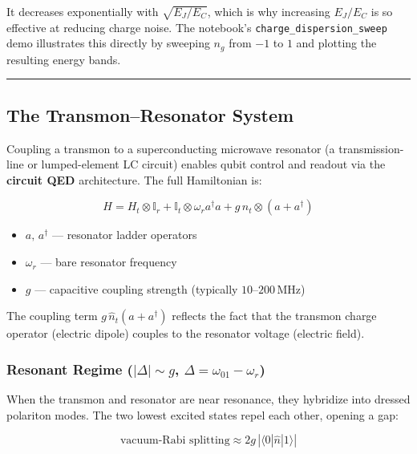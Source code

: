 \documentclass[11pt]{article}
\newcommand{\braket}[2]{\langle #1 | #2 \rangle}
\begin{document}
It decreases exponentially with $\sqrt{E_J/E_C}$, which is why increasing $E_J/E_C$ is so
effective at reducing charge noise. The notebook's \texttt{charge\_dispersion\_sweep} demo
illustrates this directly by sweeping $n_g$ from $-1$ to $1$ and plotting the resulting energy
bands.

\hrule
\vspace{1em}

\subsection{The Transmon--Resonator System}

Coupling a transmon to a superconducting microwave resonator (a transmission-line or
lumped-element LC circuit) enables qubit control and readout via the \textbf{circuit QED}
architecture. The full Hamiltonian is:

\begin{equation}
  H = H_t \otimes \mathbb{I}_r
      + \mathbb{I}_t \otimes \omega_r a^\dagger a
      + g\,\hat{n}_t \otimes \!\left(a + a^\dagger\right)
\end{equation}

\begin{itemize}
  \item $a,\,a^\dagger$ --- resonator ladder operators
  \item $\omega_r$ --- bare resonator frequency
  \item $g$ --- capacitive coupling strength (typically $10$--$200\,\text{MHz}$)
\end{itemize}

The coupling term $g\,\hat{n}_t(a + a^\dagger)$ reflects the fact that the transmon charge
operator (electric dipole) couples to the resonator voltage (electric field).

\subsubsection{Resonant Regime ($|\Delta| \sim g$, $\Delta = \omega_{01} - \omega_r$)}

When the transmon and resonator are near resonance, they hybridize into dressed polariton
modes. The two lowest excited states repel each other, opening a gap:

\begin{equation}
  \text{vacuum-Rabi splitting} \approx 2g\,\left|\braket{0}{\hat{n}|1}\right|
\end{equation}
\end{document}
